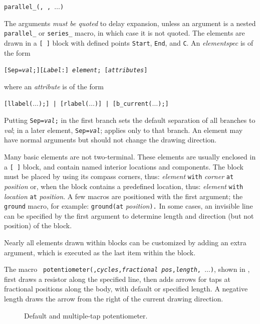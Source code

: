 {\tt parallel\_({\RQ, \RQ,}
 $\ldots$)}

The arguments {\em must be quoted} to delay expansion, unless an argument
is a nested {\tt parallel\_} or {\tt series\_} macro,
in which case it is not quoted.
The elements are drawn in a {\tt [ ]} block with defined points
{\tt Start}, {\tt End}, and {\tt C}.
An {\sl elementspec} is of the form

{\tt [Sep={\sl val};][{\sl Label}:] {\sl element}; [{\sl attributes}]}

\noindent
where an {\sl attribute} is of the form

{\tt [llabel($\ldots$);] | [rlabel($\ldots$)] | [b\_current($\ldots$);]}

Putting {\tt Sep={\sl val};} in the first branch sets the default
separation of all branches to {\sl val}; in a later
element, {\tt Sep={\sl val}}; applies only to that branch.  
An element may have normal arguments but should
not change the drawing direction. 

Many basic elements are not two-terminal. These elements are usually enclosed in
a \verb|[ ]| \pic block, and contain named interior locations and components.
The block must be placed by using its compass corners, thus:
  {\sl element} {\tt with} {\sl corner} {\tt at} {\sl position} 
or, when the block contains a predefined location, thus:
  {\sl element} {\tt with} {\sl location} {\tt at} {\sl position}.
A few macros are positioned with the first argument;
the {\tt ground} macro, for example:
  {\tt ground(}{\tt at} {\sl position}{\tt ).} 
In some cases, an invisible line can be specified by the first argument
to determine length and direction (but not position) of the block.

Nearly all elements drawn within blocks can be customized by adding an
extra argument, which is executed as the last item within the block.

The macro {\tt
   potentiometer(\linespec,{\sl cycles},{\sl fractional pos},{\sl length},
    $\ldots$)},
shown in ,
first draws a resistor along the specified line, then adds arrows for taps
at fractional positions along the body, with default or specified length.
A negative length draws the arrow from the right of the current drawing
direction.
\begin{figure}[ht!]
   
   \caption{Default and multiple-tap potentiometer.}
   \label{Potentiometers}
   \end{figure}

